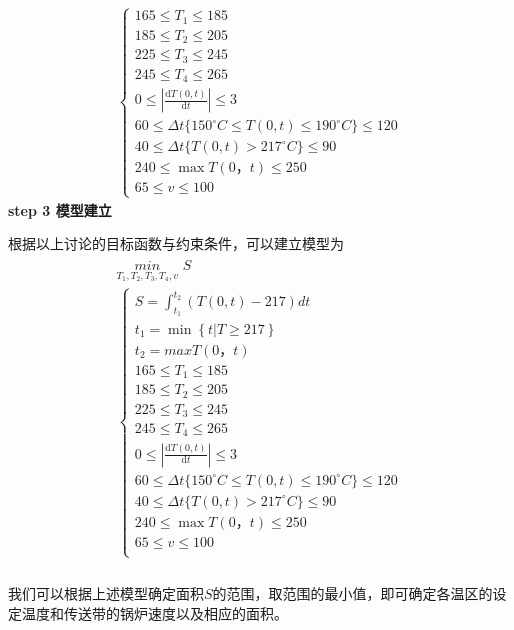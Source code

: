 \documentclass[../main.tex]{subfiles}
\begin{document}
  \begin{align}\label{8.8}
    \left\{\begin{array}{l}
      165 \leq T_1 \leq 185 
      \\
      185 \leq T_2 \leq 205
      \\
      225 \leq T_3 \leq 245   
    \\
    245 \leq T_4 \leq 265
    \\
      0\leq\left|\frac{\mathrm{d}T(0,t)}{\mathrm{d}t}\right|\leq 3
    \\ 
      60\leq\Delta t\{ 150^{\circ}C\leq T(0,t)\leq190^{\circ}C\}\leq120
    \\
      40\leq\Delta t\{T(0,t) > 217^{\circ}C\}\leq90 
    \\
      240\leq\max T(0，t)\leq250
    \\
      65\leq v\leq100
    \end{array} \right.      
  \end{align}
  \noindent \textbf{step 3 模型建立}
  \par 根据以上讨论的目标函数与约束条件，可以建立模型为
 \begin{align}
  \begin{array}{c}
    \underset{T_1,T_2,T_3,T_4,v}{min}\,\,S\\
    \left\{ \begin{array}{l}
    S=\int_{t_1}^{t_2}{\left( T\left( 0,t \right) -217 \right)}dt\\
    t_1=\min \left\{ t|T\ge 217 \right\}\\
    t_2=maxT\left( 0，t \right)\\
    165\leq T_1\leq 185\\
    185\leq T_2\leq 205\\
    225\leq T_3\leq 245\\
    245\leq T_4\leq 265\\
    0\leq \left| \frac{\text{d}T\left( 0,t \right)}{\text{d}t} \right|\leq 3\\
    60\leq \Delta t\{150^{\circ}C\leq T\left( 0,t \right) \leq 190^{\circ}C\}\leq 120\\
    40\leq \Delta t\{T\left( 0,t \right) >217^{\circ}C\}\leq 90\\
    240\leq \max T\left( 0，t \right) \leq 250\\
    65\leq v\leq 100\\
  \end{array} \right.\\
  \end{array}
 \end{align} 
 \par 我们可以根据上述模型确定面积$S$的范围，取范围的最小值，即可确定各温区的设定温度和传送带的锅炉速度以及相应的面积。
  
\end{document}
